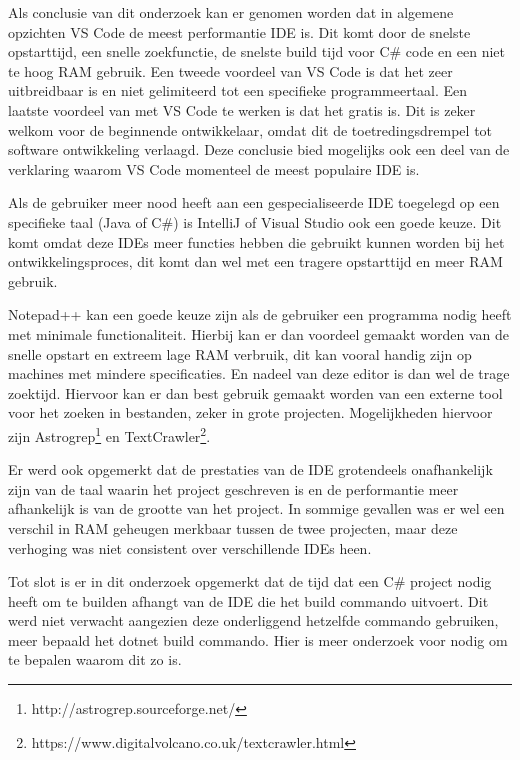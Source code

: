 Als conclusie van dit onderzoek kan er genomen worden dat in algemene opzichten VS Code de meest performantie IDE is. Dit komt door de snelste opstarttijd, een snelle zoekfunctie, de snelste build tijd voor C\# code en een niet te hoog RAM gebruik. Een tweede voordeel van VS Code is dat het zeer uitbreidbaar is en niet gelimiteerd tot een specifieke programmeertaal. Een laatste voordeel van met VS Code te werken is dat het gratis is. Dit is zeker  welkom voor de beginnende ontwikkelaar, omdat dit de toetredingsdrempel tot software ontwikkeling verlaagd. Deze conclusie bied mogelijks ook een deel van de verklaring waarom VS Code momenteel de meest populaire IDE is.

Als de gebruiker meer nood heeft aan een gespecialiseerde IDE toegelegd op een specifieke taal (Java of C\#) is IntelliJ of Visual Studio ook een goede keuze. Dit komt omdat deze IDEs meer functies hebben die gebruikt kunnen worden bij het ontwikkelingsproces, dit komt dan wel met een tragere opstarttijd en meer RAM gebruik.

Notepad++ kan een goede keuze zijn als de gebruiker een programma nodig heeft met minimale functionaliteit. Hierbij kan er dan voordeel gemaakt worden van de snelle opstart en extreem lage RAM verbruik, dit kan vooral handig zijn op machines met mindere specificaties. En nadeel van deze editor is dan wel de trage zoektijd. Hiervoor kan er dan best gebruik gemaakt worden van een externe tool voor het zoeken in bestanden, zeker in grote projecten. Mogelijkheden hiervoor zijn Astrogrep\footnote{http://astrogrep.sourceforge.net/} en TextCrawler\footnote{https://www.digitalvolcano.co.uk/textcrawler.html}.

Er werd ook opgemerkt dat de prestaties van de IDE grotendeels onafhankelijk zijn van de taal waarin het project geschreven is en de performantie meer afhankelijk is van de grootte van het project. In sommige gevallen was er wel een verschil in RAM geheugen merkbaar tussen de twee projecten, maar deze verhoging was niet consistent over verschillende IDEs heen.

Tot slot is er in dit onderzoek opgemerkt dat de tijd dat een C\# project nodig heeft om te builden afhangt van de IDE die het build commando uitvoert. Dit werd niet verwacht aangezien deze onderliggend hetzelfde commando gebruiken, meer bepaald het dotnet build commando. Hier is meer onderzoek voor nodig om te bepalen waarom dit zo is.

